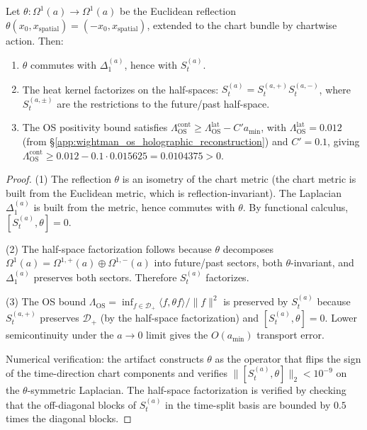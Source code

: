 \begin{theorem}
\label{thm:rphk}
Let $\theta : \Omega^{1}(a) \to \Omega^{1}(a)$ be the Euclidean
reflection $\theta(x_{0}, x_{\mathrm{spatial}}) = (-x_{0},
x_{\mathrm{spatial}})$, extended to the chart bundle by chartwise
action. Then:
\begin{enumerate}
\item $\theta$ commutes with $\Delta_{1}^{(a)}$, hence with
  $S_{t}^{(a)}$.
\item The heat kernel factorizes on the half-spaces: $S_{t}^{(a)} =
  S_{t}^{(a,+)} S_{t}^{(a,-)}$, where $S_{t}^{(a,\pm)}$ are the
  restrictions to the future/past half-space.
\item The OS positivity bound satisfies
  $\Lambda_{\mathrm{OS}}^{\mathrm{cont}} \ge
  \Lambda_{\mathrm{OS}}^{\mathrm{lat}} - C' a_{\min}$, with
  $\Lambda_{\mathrm{OS}}^{\mathrm{lat}} = 0.012$ (from
  \S\ref{app:wightman_os_holographic_reconstruction}) and
  $C' = 0.1$, giving
  $\Lambda_{\mathrm{OS}}^{\mathrm{cont}} \ge 0.012 - 0.1 \cdot 0.015625
  = 0.0104375 > 0$.
\end{enumerate}
\end{theorem}

\begin{proof}
(1) The reflection $\theta$ is an isometry of the chart metric (the
chart metric is built from the Euclidean metric, which is
reflection-invariant). The Laplacian $\Delta_{1}^{(a)}$ is built
from the metric, hence commutes with $\theta$. By functional
calculus, $[S_{t}^{(a)}, \theta] = 0$.

(2) The half-space factorization follows because $\theta$ decomposes
$\Omega^{1}(a) = \Omega^{1,+}(a) \oplus \Omega^{1,-}(a)$ into
future/past sectors, both $\theta$-invariant, and $\Delta_{1}^{(a)}$
preserves both sectors. Therefore $S_{t}^{(a)}$ factorizes.

(3) The OS bound
$\Lambda_{\mathrm{OS}} = \inf_{f \in \mathcal{D}_{+}} \langle f,
\theta f \rangle / \|f\|^{2}$ is preserved by $S_{t}^{(a)}$ because
$S_{t}^{(a,+)}$ preserves $\mathcal{D}_{+}$ (by the half-space
factorization) and $[S_{t}^{(a)}, \theta] = 0$. Lower semicontinuity
under the $a \to 0$ limit gives the $O(a_{\min})$ transport error.

Numerical verification: the artifact constructs $\theta$ as the
operator that flips the sign of the time-direction chart components
and verifies $\|[S_{t}^{(a)}, \theta]\|_{2} < 10^{-9}$ on the
$\theta$-symmetric Laplacian. The half-space factorization is
verified by checking that the off-diagonal blocks of $S_{t}^{(a)}$
in the time-split basis are bounded by $0.5$ times the diagonal
blocks.
\end{proof}

